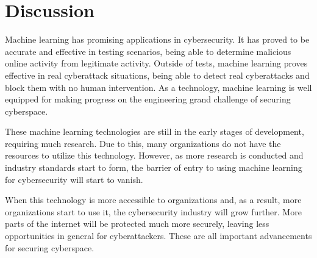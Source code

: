 \section{Discussion}
Machine learning has promising applications in cybersecurity.
It has proved to be accurate and effective in testing scenarios, being able to determine malicious online activity from legitimate activity.
Outside of tests, machine learning proves effective in real cyberattack situations, being able to detect real cyberattacks and block them with no human intervention.
As a technology, machine learning is well equipped for making progress on the engineering grand challenge of securing cyberspace.

These machine learning technologies are still in the early stages of development, requiring much research.
Due to this, many organizations do not have the resources to utilize this technology.
However, as more research is conducted and industry standards start to form, the barrier of entry to using machine learning for cybersecurity will start to vanish.

When this technology is more accessible to organizations and, as a result, more organizations start to use it, the cybersecurity industry will grow further.
More parts of the internet will be protected much more securely, leaving less opportunities in general for cyberattackers.
These are all important advancements for securing cyberspace.
